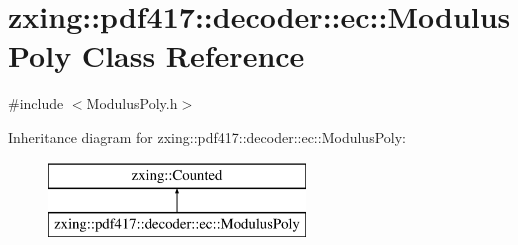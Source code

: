 \hypertarget{classzxing_1_1pdf417_1_1decoder_1_1ec_1_1_modulus_poly}{}\section{zxing\+:\+:pdf417\+:\+:decoder\+:\+:ec\+:\+:Modulus\+Poly Class Reference}
\label{classzxing_1_1pdf417_1_1decoder_1_1ec_1_1_modulus_poly}


{\ttfamily \#include $<$Modulus\+Poly.\+h$>$}

Inheritance diagram for zxing\+:\+:pdf417\+:\+:decoder\+:\+:ec\+:\+:Modulus\+Poly\+:\begin{figure}[H]
\begin{center}
\leavevmode
\includegraphics[height=2.000000cm]{classzxing_1_1pdf417_1_1decoder_1_1ec_1_1_modulus_poly}
\end{center}
\end{figure}
